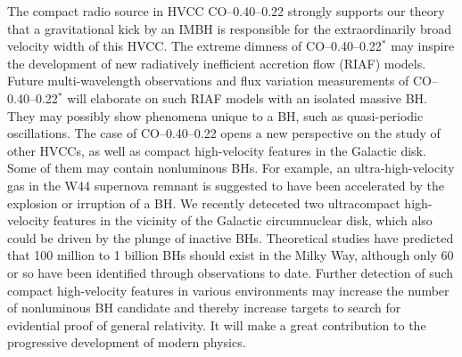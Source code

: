 \documentclass{nature}
\begin{document}
The compact radio source in HVCC CO--0.40--0.22 strongly supports our theory that a gravitational kick by an IMBH is responsible for the extraordinarily broad velocity width of this HVCC. The extreme dimness of CO--0.40--0.22$^*$ may inspire the development of new radiatively inefficient accretion flow (RIAF) models. Future multi-wavelength observations and flux variation measurements of CO--0.40--0.22$^*$ will elaborate on such RIAF models with an isolated massive BH. They may possibly show phenomena unique to a BH, such as quasi-periodic oscillations. The case of CO--0.40--0.22 opens a new perspective on the study of other HVCCs, as well as compact high-velocity features in the Galactic disk. Some of them may contain nonluminous BHs. For example, an ultra-high-velocity gas in the W44 supernova remnant\cite{Sashida13} is suggested to have been accelerated by the explosion or irruption of a BH\cite{Yamada17}. We recently deteceted two ultracompact high-velocity features in the vicinity of the Galactic circumnuclear disk, which also could be driven by the plunge of inactive BHs\cite{Takekawa17}. Theoretical studies have predicted that 100 million to 1 billion BHs should exist in the Milky Way\cite{Agol02}, although only 60 or so have been identified through observations to date\cite{Corral16}. Further detection of such compact high-velocity features in various environments may increase the number of nonluminous BH candidate and thereby increase targets to search for evidential proof of general relativity. It will make a great contribution to the progressive development of modern physics.



\end{document}
